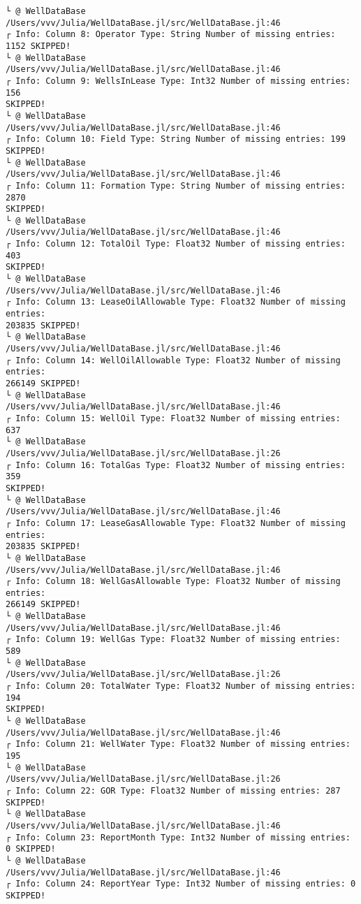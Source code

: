 \documentclass[11pt]{article}
\begin{document}
\begin{Verbatim}[commandchars=\\\{\}]
└ @ WellDataBase /Users/vvv/Julia/WellDataBase.jl/src/WellDataBase.jl:46
┌ Info: Column 8: Operator Type: String Number of missing entries: 1152 SKIPPED!
└ @ WellDataBase /Users/vvv/Julia/WellDataBase.jl/src/WellDataBase.jl:46
┌ Info: Column 9: WellsInLease Type: Int32 Number of missing entries: 156
SKIPPED!
└ @ WellDataBase /Users/vvv/Julia/WellDataBase.jl/src/WellDataBase.jl:46
┌ Info: Column 10: Field Type: String Number of missing entries: 199 SKIPPED!
└ @ WellDataBase /Users/vvv/Julia/WellDataBase.jl/src/WellDataBase.jl:46
┌ Info: Column 11: Formation Type: String Number of missing entries: 2870
SKIPPED!
└ @ WellDataBase /Users/vvv/Julia/WellDataBase.jl/src/WellDataBase.jl:46
┌ Info: Column 12: TotalOil Type: Float32 Number of missing entries: 403
SKIPPED!
└ @ WellDataBase /Users/vvv/Julia/WellDataBase.jl/src/WellDataBase.jl:46
┌ Info: Column 13: LeaseOilAllowable Type: Float32 Number of missing entries:
203835 SKIPPED!
└ @ WellDataBase /Users/vvv/Julia/WellDataBase.jl/src/WellDataBase.jl:46
┌ Info: Column 14: WellOilAllowable Type: Float32 Number of missing entries:
266149 SKIPPED!
└ @ WellDataBase /Users/vvv/Julia/WellDataBase.jl/src/WellDataBase.jl:46
┌ Info: Column 15: WellOil Type: Float32 Number of missing entries: 637
└ @ WellDataBase /Users/vvv/Julia/WellDataBase.jl/src/WellDataBase.jl:26
┌ Info: Column 16: TotalGas Type: Float32 Number of missing entries: 359
SKIPPED!
└ @ WellDataBase /Users/vvv/Julia/WellDataBase.jl/src/WellDataBase.jl:46
┌ Info: Column 17: LeaseGasAllowable Type: Float32 Number of missing entries:
203835 SKIPPED!
└ @ WellDataBase /Users/vvv/Julia/WellDataBase.jl/src/WellDataBase.jl:46
┌ Info: Column 18: WellGasAllowable Type: Float32 Number of missing entries:
266149 SKIPPED!
└ @ WellDataBase /Users/vvv/Julia/WellDataBase.jl/src/WellDataBase.jl:46
┌ Info: Column 19: WellGas Type: Float32 Number of missing entries: 589
└ @ WellDataBase /Users/vvv/Julia/WellDataBase.jl/src/WellDataBase.jl:26
┌ Info: Column 20: TotalWater Type: Float32 Number of missing entries: 194
SKIPPED!
└ @ WellDataBase /Users/vvv/Julia/WellDataBase.jl/src/WellDataBase.jl:46
┌ Info: Column 21: WellWater Type: Float32 Number of missing entries: 195
└ @ WellDataBase /Users/vvv/Julia/WellDataBase.jl/src/WellDataBase.jl:26
┌ Info: Column 22: GOR Type: Float32 Number of missing entries: 287 SKIPPED!
└ @ WellDataBase /Users/vvv/Julia/WellDataBase.jl/src/WellDataBase.jl:46
┌ Info: Column 23: ReportMonth Type: Int32 Number of missing entries: 0 SKIPPED!
└ @ WellDataBase /Users/vvv/Julia/WellDataBase.jl/src/WellDataBase.jl:46
┌ Info: Column 24: ReportYear Type: Int32 Number of missing entries: 0 SKIPPED!

\end{Verbatim}
\end{document}
